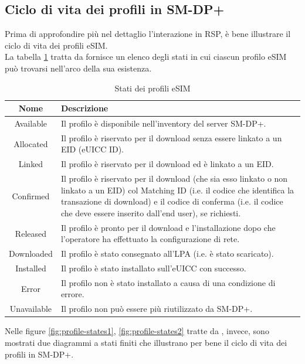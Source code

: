 \documentclass[10pt, oneside]{book}
\begin{document}
\subsection{Ciclo di vita dei profili in SM-DP+}
Prima di approfondire più nel dettaglio l'interazione in RSP, è bene illustrare il ciclo di vita dei profili eSIM.\\
La tabella \ref{tab:profile-states} tratta da \cite{GSMA-docs-new}\cite{GSMA-docs-old} fornisce un elenco degli stati in cui ciascun profilo eSIM può trovarsi nell'arco della sua esistenza.
\begin{table}[h!]
\begin{center}
\captionsetup{skip=4pt}
\caption{Stati dei profili eSIM}
\label{tab:profile-states}
\begin{tabularx}{\textwidth}{|c|X|}
\hline
\textbf{Nome} & \textbf{Descrizione}\\
\hline
Available & Il profilo è disponibile nell’inventory del server SM-DP+.\\
\hline
Allocated & Il profilo è riservato per il download senza essere linkato a un EID (eUICC ID).\\
\hline
Linked & Il profilo è riservato per il download ed è linkato a un EID.\\
\hline
Confirmed & Il profilo è riservato per il download (che sia esso linkato o non linkato a un EID) col Matching ID (i.e. il codice che identifica la transazione di download) e il codice di conferma (i.e. il codice che deve essere inserito dall'end user), se richiesti.\\
\hline
Released & Il profilo è pronto per il download e l’installazione dopo che l’operatore ha effettuato la configurazione di rete.\\
\hline
Downloaded & Il profilo è stato consegnato all’LPA (i.e. è stato scaricato).\\
\hline
Installed & Il profilo è stato installato sull’eUICC con successo.\\
\hline
Error & Il profilo non è stato installato a causa di una condizione di errore.\\
\hline
Unavailable & Il profilo non può essere più riutilizzato da SM-DP+.\\
\hline
\end{tabularx}
\end{center}
\end{table}
Nelle figure \ref{fig:profile-states1}, \ref{fig:profile-states2} tratte da \cite{GSMA-docs-new}\cite{GSMA-docs-old}, invece, sono mostrati due diagrammi a stati finiti che illustrano per bene il ciclo di vita dei profili in SM-DP+.
\end{document}
